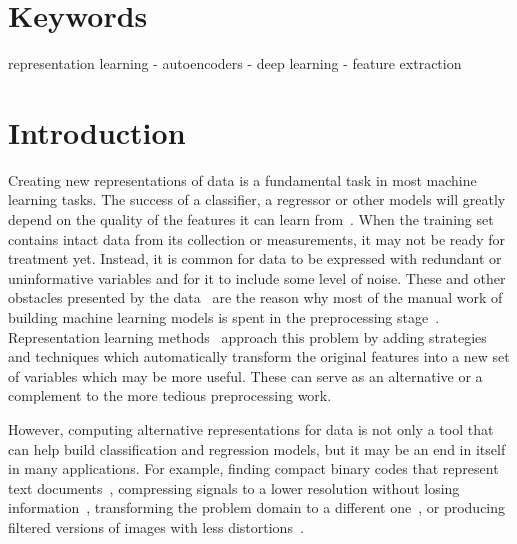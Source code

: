   \section*{Keywords}
representation learning -  autoencoders - deep learning - feature extraction



\section{Introduction}

Creating new representations of data is a fundamental task in most machine learning tasks. The success of a classifier, a regressor or other models will greatly depend on the quality of the features it can learn from~\cite{domingos-useful}. When the training set contains intact data from its collection or measurements, it may not be ready for treatment yet. Instead, it is common for data to be expressed with redundant or uninformative variables and for it to include some level of noise. These and other obstacles presented by the data~\cite{lorena2019complex} are the reason why most of the manual work of building machine learning models is spent in the preprocessing stage~\cite{garcia2015data}. Representation learning methods~\cite{bengio} approach this problem by adding strategies and techniques which automatically transform the original features into a new set of variables which may be more useful. These can serve as an alternative or a complement to the more tedious preprocessing work.

However, computing alternative representations for data is not only a tool that can help build classification and regression models, but it may be an end in itself in many applications. For example, finding compact binary codes that represent text documents~\cite{salakhutdinov}, compressing signals to a lower resolution without losing information~\cite{compression}, transforming the problem domain to a different one~\cite{transferlearning}, or producing filtered versions of images with less distortions~\cite{xie}.

